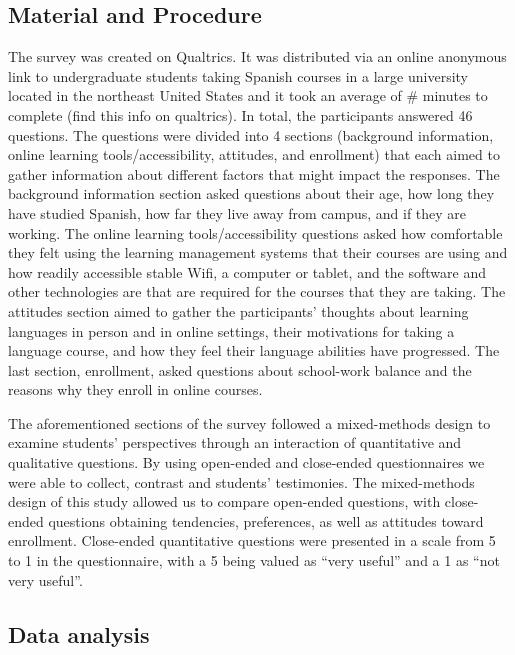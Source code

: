 \documentclass[
  man]{apa6}
\begin{document}
\hypertarget{material-and-procedure}{%
\subsection{Material and Procedure}\label{material-and-procedure}}

The survey was created on Qualtrics.
It was distributed via an online anonymous link to undergraduate students taking Spanish courses in a large university located in the northeast United States and it took an average of \# minutes to complete (find this info on qualtrics).
In total, the participants answered 46 questions.
The questions were divided into 4 sections (background information, online learning tools/accessibility, attitudes, and enrollment) that each aimed to gather information about different factors that might impact the responses.
The background information section asked questions about their age, how long they have studied Spanish, how far they live away from campus, and if they are working.
The online learning tools/accessibility questions asked how comfortable they felt using the learning management systems that their courses are using and how readily accessible stable Wifi, a computer or tablet, and the software and other technologies are that are required for the courses that they are taking.
The attitudes section aimed to gather the participants' thoughts about learning languages in person and in online settings, their motivations for taking a language course, and how they feel their language abilities have progressed.
The last section, enrollment, asked questions about school-work balance and the reasons why they enroll in online courses.

The aforementioned sections of the survey followed a mixed-methods design to examine students' perspectives through an interaction of quantitative and qualitative questions.
By using open-ended and close-ended questionnaires we were able to collect, contrast and students' testimonies.
The mixed-methods design of this study allowed us to compare open-ended questions, with close-ended questions obtaining tendencies, preferences, as well as attitudes toward enrollment.
Close-ended quantitative questions were presented in a scale from 5 to 1 in the questionnaire, with a 5 being valued as ``very useful'' and a 1 as ``not very useful''.

\hypertarget{data-analysis}{%
\subsection{Data analysis}\label{data-analysis}}
\end{document}

